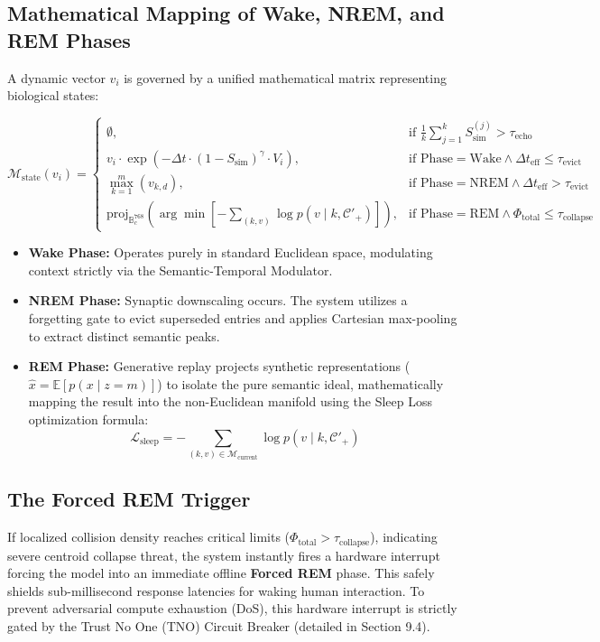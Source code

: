 \documentclass[11pt, a4paper]{article}
\begin{document}
    \subsection{Mathematical Mapping of Wake, NREM, and REM Phases}
    A dynamic vector $v_i$ is governed by a unified mathematical matrix representing biological states:
    
    \begin{equation}
    \mathcal{M}_{\text{state}}(v_i) =
    \begin{cases}
        \emptyset, & \text{if } \frac{1}{k}\sum_{j=1}^{k}S_{\text{sim}}^{(j)} > \tau_{\text{echo}} \\
        v_i \cdot \exp\left(-\Delta t \cdot (1-S_{\text{sim}})^\gamma \cdot V_i\right), & \text{if Phase} = \text{Wake} \land \Delta t_{\text{eff}} \leq \tau_{\text{evict}} \\
        \max_{k=1}^{m}(v_{k,d}), & \text{if Phase} = \text{NREM} \land \Delta t_{\text{eff}} > \tau_{\text{evict}} \\
        \text{proj}_{\mathbb{B}_c^{768}}\left(\arg\min\left[-\sum_{(k,v)}\log p(v\mid k, \mathcal{C}'_{+})\right]\right), & \text{if Phase} = \text{REM} \land \Phi_{\text{total}} \leq \tau_{\text{collapse}}
    \end{cases}
    \end{equation}

    \begin{itemize}
        \item \textbf{Wake Phase:} Operates purely in standard Euclidean space, modulating context strictly via the Semantic-Temporal Modulator.
        \item \textbf{NREM Phase:} Synaptic downscaling occurs. The system utilizes a forgetting gate to evict superseded entries and applies Cartesian max-pooling to extract distinct semantic peaks.
        \item \textbf{REM Phase:} Generative replay projects synthetic representations ($\hat{x} = \mathbb{E}[p(x\mid z=m)]$) to isolate the pure semantic ideal, mathematically mapping the result into the non-Euclidean manifold using the Sleep Loss optimization formula:
        \begin{equation}
        \mathcal{L}_{\text{sleep}} = -\sum_{(k,v)\in\mathcal{M}_{\text{current}}} \log p(v\mid k, \mathcal{C}'_{+})
        \end{equation}
    \end{itemize}

    \subsection{The Forced REM Trigger}
    If localized collision density reaches critical limits ($\Phi_{\text{total}} > \tau_{\text{collapse}}$), indicating severe centroid collapse threat, the system instantly fires a hardware interrupt forcing the model into an immediate offline \textbf{Forced REM} phase. This safely shields sub-millisecond response latencies for waking human interaction. To prevent adversarial compute exhaustion (DoS), this hardware interrupt is strictly gated by the Trust No One (TNO) Circuit Breaker (detailed in Section 9.4).
	
\end{document}
